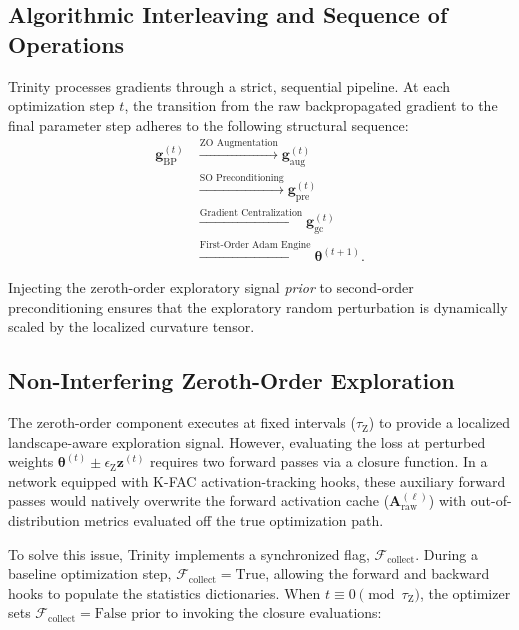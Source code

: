 \documentclass[conference]{IEEEtran}
\begin{document}
\subsection{Algorithmic Interleaving and Sequence of Operations}
\label{subsec:sequence}
Trinity processes gradients through a strict, sequential pipeline. At each optimization step $t$, the transition from the raw backpropagated gradient to the final parameter step adheres to the following structural sequence:
\begin{align}
\mathbf{g}_{\mathrm{BP}}^{(t)} &\xrightarrow{\text{ZO Augmentation}} \mathbf{g}_{\mathrm{aug}}^{(t)} \\
&\xrightarrow{\text{SO Preconditioning}} \mathbf{g}_{\mathrm{pre}}^{(t)} \\
&\xrightarrow{\text{Gradient Centralization}} \mathbf{g}_{\mathrm{gc}}^{(t)} \\
&\xrightarrow{\text{First-Order Adam Engine}} \boldsymbol{\theta}^{(t+1)}.
\end{align}

Injecting the zeroth-order exploratory signal \textit{prior} to second-order preconditioning ensures that the exploratory random perturbation is dynamically scaled by the localized curvature tensor.

\subsection{Non-Interfering Zeroth-Order Exploration}
\label{subsec:zo_mechanics}

The zeroth-order component executes at fixed intervals ($\tau_{\mathrm{Z}}$) to provide a localized landscape-aware exploration signal. However, evaluating the loss at perturbed weights $\boldsymbol{\theta}^{(t)} \pm \epsilon_{\mathrm{Z}} \mathbf{z}^{(t)}$ requires two forward passes via a closure function. In a network equipped with K-FAC activation-tracking hooks, these auxiliary forward passes would natively overwrite the forward activation cache ($\mathbf{A}_{\mathrm{raw}}^{(\ell)}$) with out-of-distribution metrics evaluated off the true optimization path.

To solve this issue, Trinity implements a synchronized flag, $\mathcal{F}_{\mathrm{collect}}$. During a baseline optimization step, $\mathcal{F}_{\mathrm{collect}} = \text{True}$, allowing the forward and backward hooks to populate the statistics dictionaries. When $t \equiv 0 \pmod{\tau_{\mathrm{Z}}}$, the optimizer sets $\mathcal{F}_{\mathrm{collect}} = \text{False}$ prior to invoking the closure evaluations:
\end{document}
